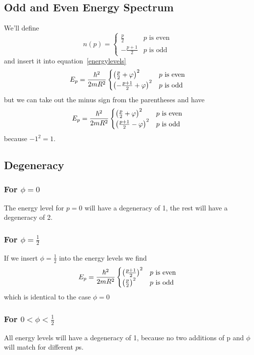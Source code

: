 \subsection{Odd and Even Energy Spectrum}
We'll define
\begin{equation}
	n(p) = \begin{cases}
		\frac{p}{2} & p \text{ is even} \\
		-\frac{p+1}{2} & p \text{ is odd}
	\end{cases}
\end{equation}
and insert it into equation~\ref{energylevels}
\begin{equation}
	E_p = \frac{\hbar^2}{2mR^2}\begin{cases}
		\left(\frac{p}{2}+\varphi\right)^2 & p \text{ is even} \\
		\left(-\frac{p+1}{2}+\varphi\right)^2 & p \text{ is odd}
	\end{cases}
\end{equation}
but we can take out the minus sign from the parentheses and have
\begin{equation}
	E_p = \frac{\hbar^2}{2mR^2}\begin{cases}
		\left(\frac{p}{2}+\varphi\right)^2 & p \text{ is even} \\
		\left(\frac{p+1}{2}-\varphi\right)^2 & p \text{ is odd}
	\end{cases}
\end{equation}
because \(-1^2=1\).
\subsection{Degeneracy}
\subsubsection{For \(\phi=0\)}
The energy level for \(p=0\) will have a degeneracy of 1, the rest will have a degeneracy of 2.
\subsubsection{For \(\phi=\frac{1}{2}\)}
If we insert \(\phi=\frac{1}{2}\) into the energy levels we find
\begin{equation}
	E_p = \frac{\hbar^2}{2mR^2}\begin{cases}
		\left(\frac{p+1}{2}\right)^2 & p \text{ is even} \\
		\left(\frac{p}{2}\right)^2 & p \text{ is odd}
	\end{cases}
\end{equation}
which is identical to the case \(\phi=0\)
\subsubsection{For \(0<\phi<\frac{1}{2}\)}
All energy levels will have a degeneracy of 1, because no two additions of p and \(\phi\) will match for different \(p\)s.